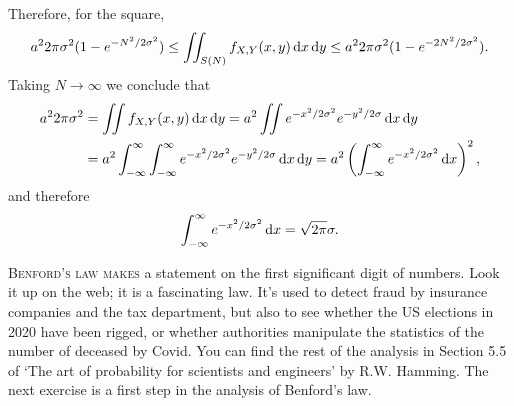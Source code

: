 \documentclass[lectures-questions]{subfiles}
\begin{document}
\begin{exercise}
\begin{solution}
Therefore, for the square,
\begin{equation}
a^{2}2\pi{\sigma^{2}} (1-e^{-N^{2}/2\sigma^{2}}) \leq
  \iint_{S(N)}f_{X,Y}(x,y) \,\textrm{d}x\,\textrm{d}y \leq
a^{2}2\pi{\sigma^{2}} (1-e^{-2N^{2}/2\sigma^{2}}).
\end{equation}
Taking $N\to\infty$ we conclude that
\begin{align}
a^{2}2\pi{\sigma^{2}}
&=\iint f_{X,Y}(x,y) \,\textrm{d}x\,\textrm{d}y
=a^{2}  \iint e^{-x^{2}/2\sigma^{2}} e^{-y^{2}/2\sigma} \,\textrm{d}x\,\textrm{d}y\\
&=a^{2}  \int_{-\infty}^{\infty} \int_{-\infty}^{\infty }e^{-x^{2}/2\sigma^{2}} e^{-y^{2}/2\sigma} \,\textrm{d}x\,\textrm{d}y
=a^{2} \left( \int_{-\infty}^{\infty }e^{-x^{2}/2\sigma^{2}} \,\textrm{d}x\right)^{2},
\end{align}
and therefore
\begin{equation}
\label{eq:0518}
\int_{-\infty}^{\infty }e^{-x^{2}/2\sigma^{2}} \,\textrm{d}x = \sqrt{2 \pi}\sigma.
\end{equation}
\end{solution}
\end{exercise}


\textsc{Benford's law makes} a statement on the first significant digit of numbers.
Look it up on the web; it is a fascinating law.
It's used to detect fraud by insurance companies and the tax department, but also to see whether the US elections in 2020 have been rigged, or whether authorities manipulate the statistics of the number of deceased by Covid.
You can find the rest of the analysis in Section 5.5 of `The art of probability for scientists and engineers' by R.W.
Hamming. The next exercise is a first step in the analysis of Benford's law.
\end{document}
